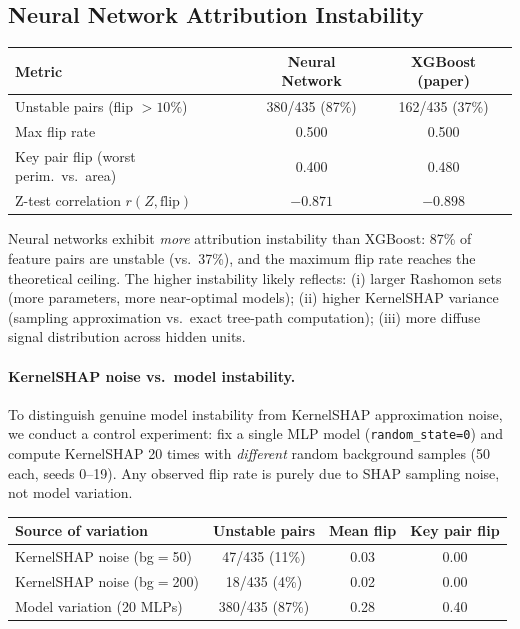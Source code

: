 \documentclass{article}
\begin{document}
\subsection{Neural Network Attribution Instability}

\begin{center}
\small
\begin{tabular}{@{}lcc@{}}
\toprule
Metric & Neural Network & XGBoost (paper) \\
\midrule
Unstable pairs (flip $> 10\%$) & 380/435 (87\%) & 162/435 (37\%) \\
Max flip rate & 0.500 & 0.500 \\
Key pair flip (worst perim.\ vs.\ area) & 0.400 & 0.480 \\
Z-test correlation $r(Z, \text{flip})$ & $-0.871$ & $-0.898$ \\
\bottomrule
\end{tabular}
\end{center}

Neural networks exhibit \emph{more} attribution instability than XGBoost: 87\% of feature pairs are unstable (vs.\ 37\%), and the maximum flip rate reaches the theoretical ceiling. The higher instability likely reflects: (i) larger Rashomon sets (more parameters, more near-optimal models); (ii) higher KernelSHAP variance (sampling approximation vs.\ exact tree-path computation); (iii) more diffuse signal distribution across hidden units.

\paragraph{KernelSHAP noise vs.\ model instability.}
To distinguish genuine model instability from KernelSHAP approximation
noise, we conduct a control experiment: fix a single MLP model
(\texttt{random\_state=0}) and compute KernelSHAP 20 times with
\emph{different} random background samples (50 each, seeds 0--19).
Any observed flip rate is purely due to SHAP sampling noise, not
model variation.

\begin{center}
\small
\begin{tabular}{@{}lccc@{}}
\toprule
Source of variation & Unstable pairs & Mean flip & Key pair flip \\
\midrule
KernelSHAP noise (bg$=$50) & 47/435 (11\%) & 0.03 & 0.00 \\
KernelSHAP noise (bg$=$200) & 18/435 (4\%) & 0.02 & 0.00 \\
Model variation (20 MLPs) & 380/435 (87\%) & 0.28 & 0.40 \\
\bottomrule
\end{tabular}
\end{center}
\end{document}
